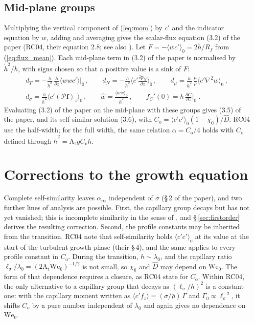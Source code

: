 \documentclass[11pt]{article}
\newcommand{\avg}[1]{\langle #1\rangle}
\newcommand{\At}{\mathrm{A_t}}
\newcommand{\We}{\mathrm{We}_0}
\newcommand{\lls}{\ell_\sigma}
\newcommand{\hd}{\dot h}
\newcommand{\pd}[2]{\frac{\partial #1}{\partial #2}}
\begin{document}
\subsection{Mid-plane groups}\label{sec:groups}

Multiplying the vertical component of (\ref{eq:mom}) by $c'$ and the indicator equation by $w$, adding and averaging gives the scalar-flux equation (3.2) of the paper (RC04, their equation 2.8; see also \citealt{Pope_book}). Let $F = -\avg{w c'}_0 = 2 \hd/R_f$ from (\ref{eq:flux_mean}). Each mid-plane term in (3.2) of the paper is normalised by $\hd^2/h$, with signs chosen so that a positive value is a sink of $F$:
\begin{equation}
  \begin{gathered}
  d_T = -\frac{h}{\hd^2} \, \pd{}{z} \avg{w w c'} \Big|_0 \, , \qquad d_N = -\frac{h}{\hd^2} \Big\langle c' \pd{p_N}{z} \Big\rangle_0 \, , \qquad d_\mu = \frac{h}{\hd^2} \, \frac{\mu}{\bar\rho} \avg{c' \nabla^2 w}_0 \;, \\
  d_\sigma = \frac{h}{\hd^2} \avg{c' (\mathcal P \mathbf f)_z}_0 \, , \qquad \hat w = \frac{\avg{w w}_0}{\hd^2} \, , \qquad f_C'(0) = h \, \pd{C}{z} \Big|_0 \;.
  \end{gathered}
  \label{eq:groups}
\end{equation}
Evaluating (3.2) of the paper on the mid-plane with these groups gives (3.5) of the paper, and its self-similar solution (3.6), with $C_\mathrm{o} = \avg{c' c'}_0 (1 - \chi_0)/\hat D$. RC04 use the half-width; for the full width, the same relation $\alpha = C_\mathrm{o}/4$ holds with $C_\mathrm{o}$ defined through $\hd^2 = \At g C_\mathrm{o} h$.

\section{Corrections to the growth equation}\label{sec:corrections}

Complete self-similarity leaves $\alpha_\infty$ independent of $\sigma$ (\S\,2 of the paper), and two further lines of analysis are possible. First, the capillary group decays but has not yet vanished; this is incomplete similarity in the sense of \citet{Barenblatt1996}, and \S\,\ref{sec:firstorder} derives the resulting correction. Second, the profile constants may be inherited from the transition. RC04 note that self-similarity holds $\avg{c' c'}_\mathrm{o}$ at its value at the start of the turbulent growth phase (their \S\,4), and the same applies to every profile constant in $C_\mathrm{o}$. During the transition, $h \sim \lambda_0$, and the capillary ratio $\lls/\lambda_0 = (2 \At \We)^{-1/2}$ is not small, so $\chi_0$ and $\hat D$ may depend on $\We$. The form of that dependence requires a closure, as RC04 state for $C_\mathrm{o}$. Within RC04, the only alternative to a capillary group that decays as $(\lls/h)^2$ is a constant one: with the capillary moment written as $\avg{c' f_z} = (\sigma/\bar\rho) \, \Gamma$ and $\Gamma_0 \propto \lls^{-2}$, it shifts $C_\mathrm{o}$ by a pure number independent of $\lambda_0$ and again gives no dependence on $\We$.
\end{document}
